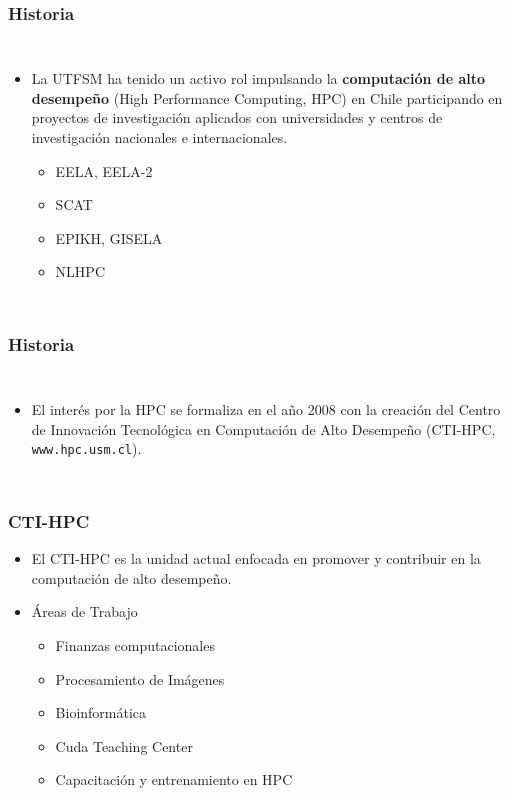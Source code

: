 \frame
{
\frametitle{Historia}
\begin{columns}
\begin{itemize}
\item La UTFSM ha tenido un activo rol impulsando la \textbf{computación de
alto desempeño} (High Performance Computing, HPC) en Chile participando en
proyectos
de investigación aplicados con universidades y centros de investigación
nacionales e internacionales. 
	\begin{itemize}
		\item EELA, EELA-2
		\item SCAT
		\item EPIKH, GISELA
		\item NLHPC
	\end{itemize}
\end{itemize}
\end{columns}
}


\frame
{
\frametitle{Historia}
\begin{columns}
\begin{itemize}
\item El interés por la HPC se formaliza en el año 2008 con la creación del
Centro de Innovación Tecnológica en Computación de Alto Desempeño (CTI-HPC,
\texttt{www.hpc.usm.cl}).

\end{itemize}
\end{columns}
}





\frame
{
\frametitle{CTI-HPC}
        \begin{itemize}
	    \item El CTI-HPC es la unidad actual enfocada en promover y
contribuir en la computación de alto desempeño.
	    \item Áreas de Trabajo	
		\begin{itemize}
		\item Finanzas computacionales
		\item Procesamiento de Imágenes
		\item Bioinformática
		\item Cuda Teaching Center
		\item Capacitación y entrenamiento en HPC
		\end{itemize}
        \end{itemize}
}

